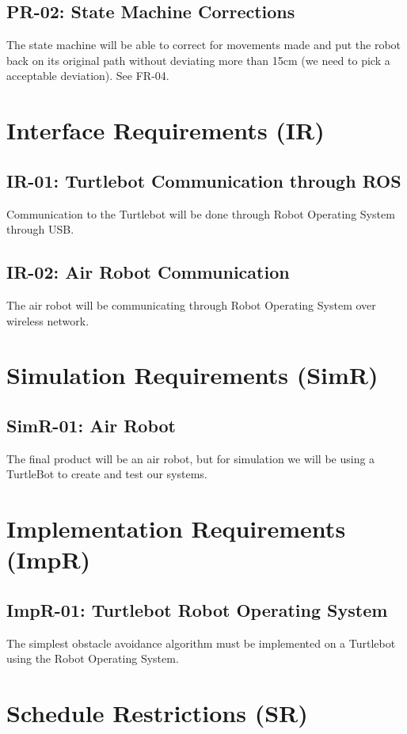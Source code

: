 \documentclass[]{report}
\begin{document}
\subsection{PR-02: State Machine Corrections}
The state machine will be able to correct for movements made and put the robot back on its original path without deviating more than 15cm (we need to pick a acceptable deviation). See FR-04.


\section{Interface Requirements (IR)}

\subsection{IR-01: Turtlebot Communication through ROS}
Communication to the Turtlebot will be done through Robot Operating System through USB.

\subsection{IR-02: Air Robot Communication}
The air robot will be communicating through Robot Operating System over wireless network.


\section{Simulation Requirements (SimR)}

\subsection{SimR-01: Air Robot}
The final product will be an air robot, but for simulation we will be using a TurtleBot to create and test our systems. 


\section{Implementation Requirements (ImpR)}

\subsection{ImpR-01: Turtlebot Robot Operating System}
The simplest obstacle avoidance algorithm must be implemented on a Turtlebot using the Robot Operating System.


\section{Schedule Restrictions (SR)}
\end{document}
